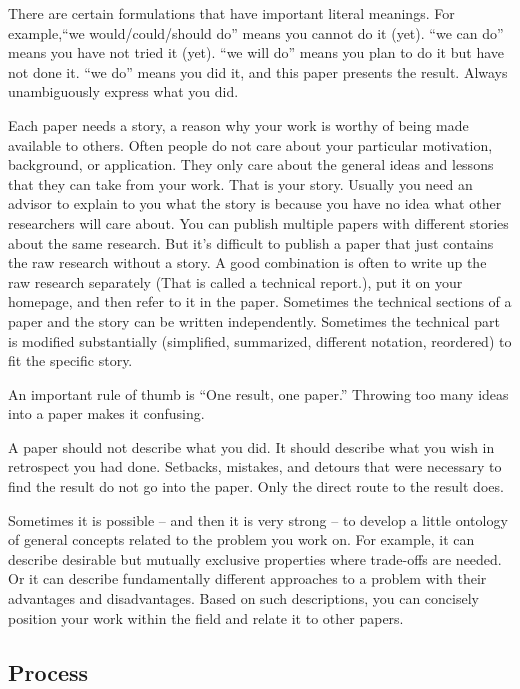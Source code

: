 \documentclass[12pt]{article}
\begin{document}
There are certain formulations that have important literal meanings.
For example,``we would/could/should do'' means you cannot do it (yet).
``we can do'' means you have not tried it (yet).
``we will do'' means you plan to do it but have not done it.
``we do'' means you did it, and this paper presents the result.
Always unambiguously express what you did.
\medskip

Each paper needs a story, a reason why your work is worthy of being made available to others.
Often people do not care about your particular motivation, background, or application.
They only care about the general ideas and lessons that they can take from your work. That is your story.
Usually you need an advisor to explain to you what the story is because you have no idea what other researchers will care about.
You can publish multiple papers with different stories about the same research. But it's difficult to publish a paper that just contains the raw research without a story.
A good combination is often to write up the raw research separately (That is called a technical report.), put it on your homepage, and then refer to it in the paper.
Sometimes the technical sections of a paper and the story can be written independently. Sometimes the technical part is modified substantially (simplified, summarized, different notation, reordered) to fit the specific story.
\medskip

An important rule of thumb is ``One result, one paper.''
Throwing too many ideas into a paper makes it confusing.
\medskip

A paper should not describe what you did.
It should describe what you wish in retrospect you had done.
Setbacks, mistakes, and detours that were necessary to find the result do not go into the paper.
Only the direct route to the result does.
\medskip

Sometimes it is possible -- and then it is very strong -- to develop a little ontology of general concepts related to the problem you work on.
For example, it can describe desirable but mutually exclusive properties where trade-offs are needed.
Or it can describe fundamentally different approaches to a problem with their advantages and disadvantages.
Based on such descriptions, you can concisely position your work within the field and relate it to other papers.

\subsection{Process}
\end{document}
